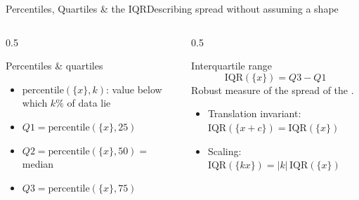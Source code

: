 \documentclass[aspectratio=169,11pt]{beamer}
\begin{document}
\begin{frame}{Percentiles, Quartiles \& the IQR}{Describing spread without assuming a shape}
  \begin{columns}[T]
    \begin{column}{0.5\textwidth}
      \begin{block}{Percentiles \& quartiles}
        \small
        \begin{itemize}
          \item $\text{percentile}(\{x\},k)$: value below which $k\%$ of data lie
          \item $Q1 = \text{percentile}(\{x\},25)$
          \item $Q2 = \text{percentile}(\{x\},50) = $ median
          \item $Q3 = \text{percentile}(\{x\},75)$
        \end{itemize}
      \end{block}
    \end{column}
    \begin{column}{0.5\textwidth}
      \begin{exampleblock}{Interquartile range}
        \[ \text{IQR}(\{x\}) = Q3 - Q1 \]
        \small Robust measure of the spread of the .
        \begin{itemize}\small
          \item Translation invariant: $\text{IQR}(\{x+c\})=\text{IQR}(\{x\})$
          \item Scaling: $\text{IQR}(\{kx\}) = |k|\,\text{IQR}(\{x\})$
        \end{itemize}
      \end{exampleblock}
    \end{column}
  \end{columns}
\end{frame}
\end{document}
